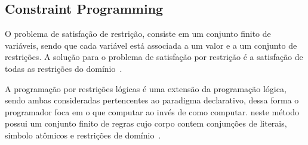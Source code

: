 

\subsection{Constraint Programming}

O problema de satisfação de restrição, consiste em um conjunto finito de variáveis, sendo que cada variável está associada a um valor e a um conjunto de restrições.  A solução para o problema de satisfação por restrição é a satisfação de todas as restrições do domínio~\cite{maria:2008}.

A programação por restrições lógicas é uma extensão da programação lógica, sendo ambas consideradas pertencentes ao paradigma declarativo, dessa forma o programador foca em o que computar ao invés de como computar. neste método possui um conjunto finito de regras cujo corpo contem conjunções de literais, simbolo atômicos e restrições de domínio~\cite{maria:2008}.




